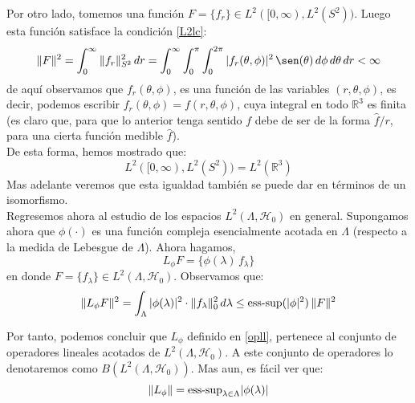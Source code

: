 \documentclass[12pt]{book}
\numberwithin{equation}{chapter}
\def\R{\mathbb{R}}
\def\t{\theta}
\def\H{\mathcal{H}}
\begin{document}
Por otro lado, tomemos una funci\'on $F=\{ f_{r} \} \in L^{2}( [0,\infty),L^{2}(S^{2}) )$. Luego esta funci\'on satisface la condici\'on \eqref{L2lc}:
\begin{equation}
\| F \|^{2}= \int_{0}^{\infty} \| f_{r} \|_{S^{2}}^{2} \, dr = \int_{0}^{\infty} \int_{0}^{\pi} \int_{0}^{2\pi} | f_{r}(\t,\phi) |^{2} \, \sen(\t) \, d\phi \, d\t \, dr < \infty
\end{equation}
de aqu\'i observamos que $f_{r}(\t,\phi)$, es una funci\'on de las variables $(r,\t,\phi)$, es decir, podemos escribir $f_{r}(\t,\phi)=f(r,\t,\phi)$, cuya integral en todo $\R^{3}$ es finita (es claro que, para que lo anterior tenga sentido $f$ debe de ser de la forma $\hat{f}/r$, para una cierta funci\'on medible $\hat{f}$).\\
De esta forma, hemos mostrado que:
\begin{equation}
L^{2}( [0,\infty),L^{2}(S^{2}) ) = L^{2}(\R^{3})
\end{equation}
Mas adelante veremos que esta igualdad tambi\'en se puede dar en t\'erminos de un isomorfismo.\\

Regresemos ahora al estudio de los espacios $L^{2}( \Lambda , \H_{0} )$ en general. Supongamos ahora que $\phi (\cdot)$ es una funci\'on compleja esencialmente acotada en $\Lambda$ (respecto a la medida de Lebesgue de $\Lambda$). Ahora hagamos,
\begin{equation}\label{opll}
L_{\phi} F= \{ \phi(\lambda) \, f_{\lambda} \}
\end{equation}
en donde $F= \{ f_{\lambda} \} \in L^{2}( \Lambda , \H_{0} ) $. Observamos que:
$$ \| L_{\phi} F \|^{2}= \int_{\Lambda} |\phi(\lambda)|^{2} \cdot \| f_{\lambda} \|_{0}^{2} \, d \lambda \leq \hbox{ess-sup}(|\phi|^{2})\, \|F\|^{2} $$

Por tanto, podemos concluir que $L_{\phi}$ definido en \eqref{opll}, pertenece al conjunto de operadores lineales acotados de $L^{2}(\Lambda , \H_{0})$. A este conjunto de operadores lo denotaremos como $B( L^{2}(\Lambda , \H_{0}) )$. Mas aun, es f\'acil ver que:
\begin{equation}
\| L_{\phi} \|= \hbox{ess-sup}_{\lambda \in \Lambda} |\phi (\lambda)| 
\end{equation}
\end{document}
